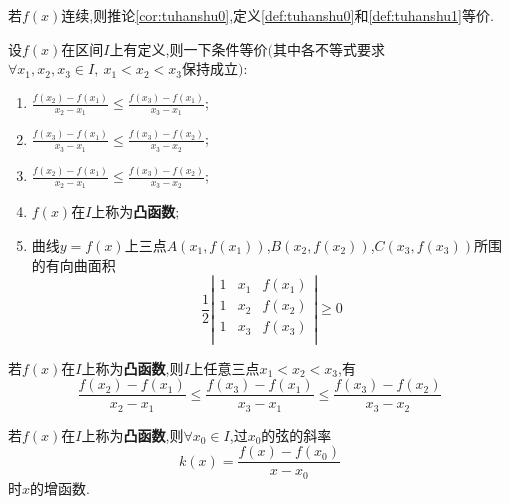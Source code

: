 \begin{theorem}
	若$f\left( x \right) $连续,则推论\ref{cor:tuhanshu0},定义\ref{def:tuhanshu0}和\ref{def:tuhanshu1}等价.
\end{theorem}

\begin{theorem}
	设$f\left( x \right) $在区间$I$上有定义,则一下条件等价$($其中各不等式要求$\forall x_1,x_2,x_3\in I,\ x_1<x_2<x_3$保持成立$)$:
	\begin{enumerate}
		\item $\frac{f\left( x_2 \right) -f\left( x_1 \right)}{x_2-x_1}\le \frac{f\left( x_3 \right) -f\left( x_1 \right)}{x_3-x_1}$;
		\item $\frac{f\left( x_3 \right) -f\left( x_1 \right)}{x_3-x_1}\le \frac{f\left( x_3 \right) -f\left( x_2 \right)}{x_3-x_2}$;
		\item $\frac{f\left( x_2 \right) -f\left( x_1 \right)}{x_2-x_1}\le \frac{f\left( x_3 \right) -f\left( x_2 \right)}{x_3-x_2}$;
		\item $f\left( x \right) $在$I$上称为\textbf{凸函数};
		\item 曲线$y=f\left( x \right) $上三点$A\left( x_1,f\left( x_1 \right)  \right) $,$B\left( x_2,f\left( x_2 \right)  \right) $,$C\left( x_3,f\left( x_3 \right)  \right) $所围的有向曲面积
		      $$
			      \frac{1}{2}\left| \begin{matrix}
				      1 & x_1 & f\left( x_1 \right) \\
				      1 & x_2 & f\left( x_2 \right) \\
				      1 & x_3 & f\left( x_3 \right) \\
			      \end{matrix} \right|\ge 0
		      $$
	\end{enumerate}
\end{theorem}

\begin{corollary}
	若$f\left( x \right) $在$I$上称为\textbf{凸函数},则$I$上任意三点$x_1<x_2<x_3$,有
	$$
		\frac{f\left( x_2 \right) -f\left( x_1 \right)}{x_2-x_1}\le \frac{f\left( x_3 \right) -f\left( x_1 \right)}{x_3-x_1}\le \frac{f\left( x_3 \right) -f\left( x_2 \right)}{x_3-x_2}
	$$
\end{corollary}

\begin{corollary}
	若$f\left( x \right) $在$I$上称为\textbf{凸函数},则$\forall x_0\in I$,过$x_0$的弦的斜率
	$$
		k\left( x \right) =\frac{f\left( x \right) -f\left( x_0 \right)}{x-x_0}
	$$
	时$x$的增函数.
\end{corollary}

